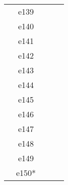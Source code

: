 \documentclass[10pt,letterpaper]{article}
\begin{document}
\begin{center}
\begin{tabular}{ |c|c|c|c|c|}
        & e139  &                &                &      \\
        & e140  &                &                &      \\
        & e141  &                &                &      \\
        & e142  &                &                &      \\
        & e143  &                &                &      \\
        & e144  &                &                &      \\
        & e145  &                &                &      \\
        & e146  &                &                &      \\
        & e147  &                &                &      \\
        & e148  &                &                &      \\
        & e149  &                &                &      \\
        & e150* &                &                &      \\

        \hline
        \end{tabular}
        \end{center}
\end{document}
